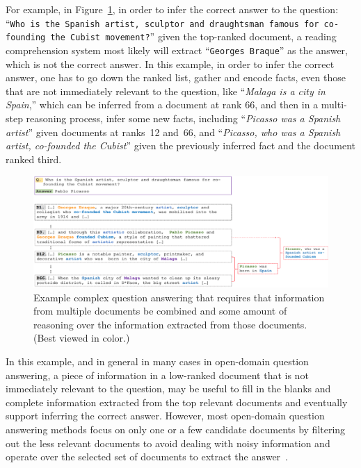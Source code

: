 For example, in Figure~\ref{fig:example}, in order to infer the correct answer to the question: ``\texttt{Who is the Spanish artist, sculptor and draughtsman famous for co-founding the Cubist movement?}'' given the top-ranked document, a reading comprehension system most likely will extract ``\texttt{Georges Braque}'' as the answer, which is not the correct answer. 
In this example, in order to infer the correct answer, one has to go down the ranked list, gather and encode facts, even those that are not immediately relevant to the question, like ``\emph{Malaga is a city in Spain},'' which can be inferred from a document at rank 66, and then in a multi-step reasoning process, infer some new facts, including ``\emph{Picasso was a Spanish artist}'' given documents at ranks~12 and~66, and ``\emph{Picasso, who was a Spanish artist, co-founded the Cubist}'' given the previously inferred fact and the document ranked third. 

\begin{figure}[!t]
 \centering
 \includegraphics[width=\textwidth]{04-part-03/chapter-06/figs_and_tables/fig_od_example.png}
 \caption{Example complex question answering that requires that information from multiple documents be combined and some amount of reasoning over the information extracted from those documents. (Best viewed in color.)}
 \label{fig:example}
\end{figure}

In this example, and in general in many cases in open-domain question answering, a piece of information in a low-ranked document that is not immediately relevant to the question, may be useful to fill in the blanks and complete information extracted from the top relevant documents and eventually support inferring the correct answer.
However, most open-domain question answering methods focus on only one or a few candidate documents by filtering out the less relevant documents to avoid dealing with noisy information and operate over the selected set of documents to extract the answer~\citep{wang2017r, wang2017evidence,lin2018denoising}. 

